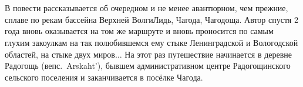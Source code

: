 \chapter*{}

В повести рассказывается об очередном и не менее авантюрном, чем прежние, сплаве по рекам бассейна Верхней Волги\mdash Лидь, Чагода, Чагодоща. Автор спустя 2 года вновь оказывается на том же маршруте и вновь проносится по самым глухим закоулкам на так полюбившемся ему стыке Ленинградской и Вологодской областей, на стыке двух миров$\ldots$ На этот раз путешествие начинается в деревне Радогощь (вепс.~Arskaht'), бывшем административном центре Радогощинского сельского поселения и заканчивается в посёлке Чагода.
%
